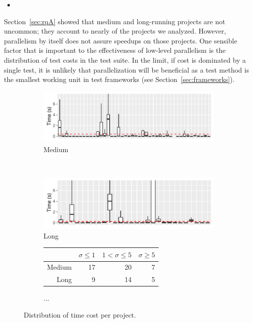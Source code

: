 \begin{itemize}
    \item \emph{\RQB}
\end{itemize}

Section~\ref{sec:rqA} showed that medium and long-running projects are
not uncommon; they account to nearly \percentMedLongRunning{} of the
\numSubjs{} projects we analyzed.  However, parallelism by itself does
not assure speedups on those projects.  One sensible factor that is
important to the effectiveness of low-level parallelism is the
distribution of test costs in the test suite.  In the limit, if cost
is dominated by a single test, it is unlikely that parallelization
will be beneficial as a test method is the smallest working unit in
test frameworks (see Section~\ref{sec:frameworks}).

\begin{figure}[ht]
    \centering

    \begin{subfigure}{0.5\textwidth}
      \centering
      \includegraphics[width=\textwidth]{R/testcost-med.pdf}
      \caption{\label{fig:medtcost}Medium}
    \end{subfigure}\\
    
    \begin{subfigure}{0.5\textwidth}
      \centering
      \includegraphics[width=\textwidth]{R/testcost-long.pdf}
      \caption{\label{fig:longtcost}Long}
    \end{subfigure}%
    
    \begin{subfigure}{0.5\textwidth}
      \centering
      \begin{tabular}{rrrr}
        \toprule
        & $\sigma\leq1$ & $1<\sigma\leq5$ & $\sigma\ge5$ \\
        \midrule    
        Medium & 17 & 20 & 7 \\
        Long   &  9 & 14 & 5 \\
        \bottomrule
      \end{tabular}
      \caption{\label{fig:sd}...}    
    \end{subfigure}%

    \caption{\label{fig:time-distributions}Distribution of time cost per project.}    
\end{figure}

